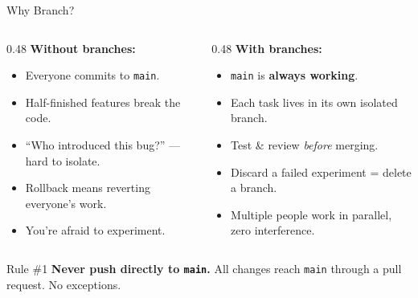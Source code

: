\documentclass[aspectratio=169, 11pt]{beamer}
\begin{document}
\begin{frame}{Why Branch?}
  \begin{columns}[T]
    \begin{column}{0.48\textwidth}
      \textbf{Without branches:}
      \begin{itemize}
        \item Everyone commits to \texttt{main}.
        \item Half-finished features break the code.
        \item ``Who introduced this bug?'' --- hard to isolate.
        \item Rollback means reverting everyone's work.
        \item You're afraid to experiment.
      \end{itemize}
    \end{column}
    \begin{column}{0.48\textwidth}
      \textbf{With branches:}
      \begin{itemize}
        \item \texttt{main} is \textbf{always working}.
        \item Each task lives in its own isolated branch.
        \item Test \& review \emph{before} merging.
        \item Discard a failed experiment = delete a branch.
        \item Multiple people work in parallel, zero interference.
      \end{itemize}
    \end{column}
  \end{columns}

  \vspace{0.5em}
  \begin{alertblock}{Rule \#1}
    \textbf{Never push directly to \texttt{main}.}
    All changes reach \texttt{main} through a pull request. No exceptions.
  \end{alertblock}
\end{frame}
\end{document}
